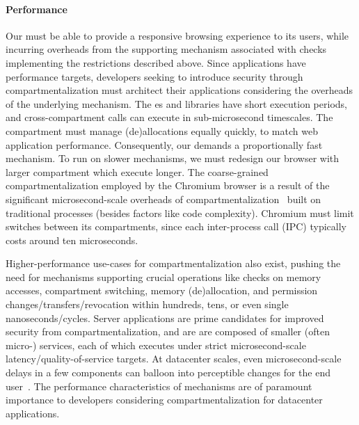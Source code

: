\paragraph{Performance}
Our \browser must be able to provide a responsive browsing experience to its 
users, while incurring overheads from the supporting mechanism associated with 
checks implementing the restrictions described above.
Since applications have performance targets, developers seeking to introduce 
security through compartmentalization must architect their applications 
considering  the overheads of the underlying mechanism.
The \sandbox{}es and \nested libraries have short execution periods, and
cross-compartment calls can execute in sub-microsecond timescales.
The \manager compartment must manage (de)allocations equally quickly, to
match web application performance.
Consequently, our \browser demands a proportionally fast mechanism.
To run on slower mechanisms, we must redesign our browser with larger 
compartment which execute longer.
The coarse-grained compartmentalization employed by the Chromium browser
is a result of the significant microsecond-scale overheads of 
compartmentalization~\cite{LittonVE0BD16} built on 
traditional processes (besides factors like code complexity).
Chromium must limit switches between its compartments, since each
inter-process call (IPC) typically costs around ten microseconds.

Higher-performance use-cases for compartmentalization also exist, pushing
the need for mechanisms supporting crucial operations like checks on 
memory accesses, compartment switching, memory (de)allocation, and 
permission changes/transfers/revocation within hundreds, tens, or even single
nanoseconds/cycles.
Server applications are prime candidates for improved security from 
compartmentalization, and are are composed of smaller (often micro-) services,
each of which executes under strict microsecond-scale latency/quality-of-service 
targets.
At datacenter scales, even microsecond-scale delays in a few components can 
balloon into perceptible changes for the end user~\cite{LiSPG14, DeanB13}.
The performance characteristics of mechanisms are of paramount importance to
developers considering compartmentalization for datacenter applications.

